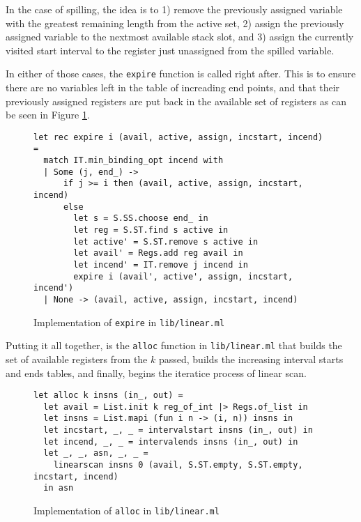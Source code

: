 \documentclass{article}
\begin{document}
In the case of spilling, the idea is to 1) remove the previously assigned variable with the greatest remaining length from the active set, 2) assign the previously assigned variable to the nextmost available stack slot, and 3) assign the currently visited start interval to the register just unassigned from the spilled variable.

In either of those cases, the \texttt{expire} function is called right after. This is to ensure there are no variables left in the table of increading end points, and that their previously assigned registers are put back in the available set of registers as can be seen in Figure \ref{fig:expire-ocaml}.


\begin{figure}[H]
     \centering
     \begin{verbatim}
let rec expire i (avail, active, assign, incstart, incend) =
  match IT.min_binding_opt incend with
  | Some (j, end_) ->
      if j >= i then (avail, active, assign, incstart, incend)
      else
        let s = S.SS.choose end_ in
        let reg = S.ST.find s active in
        let active' = S.ST.remove s active in
        let avail' = Regs.add reg avail in
        let incend' = IT.remove j incend in
        expire i (avail', active', assign, incstart, incend')
  | None -> (avail, active, assign, incstart, incend)
     \end{verbatim}
     \caption{Implementation of \texttt{expire} in \texttt{lib/linear.ml}}\label{fig:expire-ocaml}
\end{figure}

\noindent Putting it all together, is the \texttt{alloc} function in \texttt{lib/linear.ml} that builds the set of available registers from the \(k\) passed, builds the increasing interval starts and ends tables, and finally, begins the iteratice process of linear scan.
\begin{figure}[H]
     \centering
     \begin{verbatim}
let alloc k insns (in_, out) =
  let avail = List.init k reg_of_int |> Regs.of_list in
  let insns = List.mapi (fun i n -> (i, n)) insns in
  let incstart, _, _ = intervalstart insns (in_, out) in
  let incend, _, _ = intervalends insns (in_, out) in
  let _, _, asn, _, _ =
    linearscan insns 0 (avail, S.ST.empty, S.ST.empty, incstart, incend)
  in asn
     \end{verbatim}
     \caption{Implementation of \texttt{alloc} in \texttt{lib/linear.ml}}\label{fig:intervals-ocaml}
\end{figure}
\end{document}
